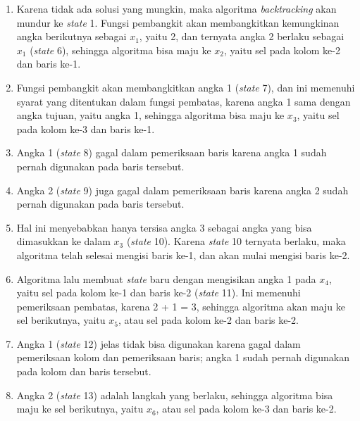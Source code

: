 \documentclass[a4paper,twoside]{article}
\begin{document}
\begin{enumerate}
\begin{enumerate}
\item Karena tidak ada solusi yang mungkin, maka algoritma \textit{backtracking} akan mundur ke \textit{state} 1. Fungsi pembangkit akan membangkitkan kemungkinan angka berikutnya sebagai \begin{math}x_1\end{math}, yaitu 2, dan ternyata angka 2 berlaku sebagai \begin{math}x_1\end{math} (\textit{state} 6), sehingga algoritma bisa maju ke \begin{math}x_2\end{math}, yaitu sel pada kolom ke-2 dan baris ke-1.
\item Fungsi pembangkit akan membangkitkan angka 1 (\textit{state} 7), dan ini memenuhi syarat yang ditentukan dalam fungsi pembatas, karena angka 1 sama dengan angka tujuan, yaitu angka 1, sehingga algoritma bisa maju ke \begin{math}x_3\end{math}, yaitu sel pada kolom ke-3 dan baris ke-1.
\item Angka 1 (\textit{state} 8) gagal dalam pemeriksaan baris karena angka 1 sudah pernah digunakan pada baris tersebut.
\item Angka 2 (\textit{state} 9) juga gagal dalam pemeriksaan baris karena angka 2 sudah pernah digunakan pada baris tersebut.
\item Hal ini menyebabkan hanya tersisa angka 3 sebagai angka yang bisa dimasukkan ke dalam \begin{math}x_3\end{math} (\textit{state} 10). Karena \textit{state} 10 ternyata berlaku, maka algoritma telah selesai mengisi baris ke-1, dan akan mulai mengisi baris ke-2.
\item Algoritma lalu membuat \textit{state} baru dengan mengisikan angka 1 pada \begin{math}x_4\end{math}, yaitu sel pada kolom ke-1 dan baris ke-2 (\textit{state} 11). Ini memenuhi pemeriksaan pembatas, karena 2 + 1 = 3, sehingga algoritma akan maju ke sel berikutnya, yaitu \begin{math}x_5\end{math}, atau sel pada kolom ke-2 dan baris ke-2.
\item Angka 1 (\textit{state} 12) jelas tidak bisa digunakan karena gagal dalam pemeriksaan kolom dan pemeriksaan baris; angka 1 sudah pernah digunakan pada kolom dan baris tersebut.
\item Angka 2 (\textit{state} 13) adalah langkah yang berlaku, sehingga algoritma bisa maju ke sel berikutnya, yaitu \begin{math}x_6\end{math}, atau sel pada kolom ke-3 dan baris ke-2.

\end{enumerate}
\end{enumerate}
\end{document}
